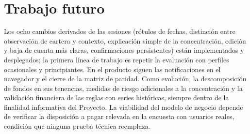 \section*{Trabajo futuro}

Los ocho cambios derivados de las sesiones (rótulos de fechas, distinción entre observación de cartera y contexto, explicación simple de la concentración, edición y baja de cuenta más claras, confirmaciones persistentes) están implementados y desplegados; la primera línea de trabajo es repetir la evaluación con perfiles ocasionales y principiantes. En el producto siguen las notificaciones en el navegador y el cierre de la matriz de paridad. Como evolución, la descomposición de fondos en sus tenencias, medidas de riesgo adicionales a la concentración y la validación financiera de las reglas con series históricas, siempre dentro de la finalidad informativa del Proyecto. La viabilidad del modelo de negocio depende de verificar la disposición a pagar relevada en la encuesta con usuarios reales, condición que ninguna prueba técnica reemplaza.

